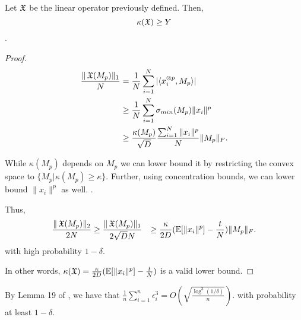 \begin{lemma}
Let $\operatorname{\mathfrak{X}}$ be the linear operator previously defined. Then,
$$\kappa(\operatorname{\mathfrak{X}}) \ge Y$$.
\end{lemma}
\begin{proof}

  \begin{align*}
    \frac{\|\operatorname{\mathfrak{X}}(M_p)\|_1}{N} &= \frac{1}{N}\sum_{i=1}^{N} |\langle x_i^{\otimes p}, M_p \rangle| \\
    &\ge \frac{1}{N}\sum_{i=1}^{N} \sigma_{min}( M_p ) \|x_i\|^p \\
    &\ge \frac{\kappa(M_p)}{\sqrt{D}} \frac{\sum_{i=1}^{N} \|x_i\|^p}{N} \| M_p \|_F.
  \end{align*}

  While $\kappa(M_p)$ depends on $M_p$ we can lower bound it by
  restricting the convex space to $\{ M_p | \kappa(M_p) \ge \kappa \}$.
  Further, using concentration bounds, we can lower bound $\|x_i\|^p$ as
  well. .
  
  Thus, 
  \begin{align*}
  \frac{ \|\operatorname{\mathfrak{X}}(M_p)\|_2 }{2 N} 
  &\ge
  \frac{ \|\operatorname{\mathfrak{X}}(M_p)\|_1 }{2 \sqrt{D}N} 
  &\ge \frac{\kappa}{2 D} (\operatorname{\mathbb{E}}[\|x_i\|^p] - \frac{t}{N}) \| M_p \|_F.
  \end{align*}
  with high probability $1 - \delta$. 
  
  In other words, $\kappa(\operatorname{\mathfrak{X}})
  = \frac{\kappa}{2 D} (\operatorname{\mathbb{E}}[\|x_i\|^p] - \frac{t}{N})$ is a valid
  lower bound.
\end{proof}

By Lemma 19 of \cite{hsu13spherical},
we have that $\frac{1}{n} \sum_{i=1}^n \epsilon_i^3 = O(\sqrt{\frac{\log^3(1/\delta)}{n}})$.
with probability at least $1-\delta$.

